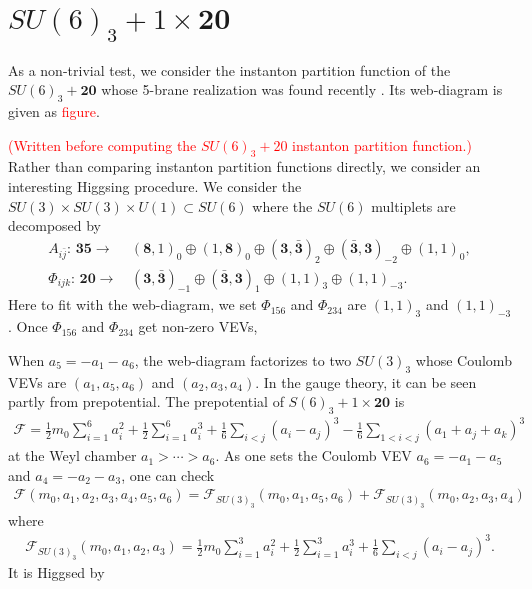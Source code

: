 \documentclass[12pt]{article}
\begin{document}
\section{$SU(6)_3+1\times\boldsymbol{20}$}

As a non-trivial test, we consider the instanton partition function of the $SU(6)_3+\boldsymbol{20}$ whose 5-brane realization was found recently \cite{Hayashi:2019yxj}. Its web-diagram is given as \textcolor{red}{figure}.

\textcolor{red}{(Written before computing the $SU(6)_3+20$ instanton partition function.)}\\
Rather than comparing instanton partition functions directly, we consider an interesting Higgsing procedure. We consider the $SU(3)\times SU(3)\times U(1)\subset SU(6)$ where the $SU(6)$ multiplets are decomposed by
\begin{align}
A_{i\bar{j}}:\,\boldsymbol{35}\longrightarrow&\,(\boldsymbol{8},1)_0\oplus (1,\boldsymbol{8})_0\oplus (\boldsymbol{3},\bar{\boldsymbol{3}})_2\oplus(\bar{\boldsymbol{3}},\boldsymbol{3})_{-2}\oplus(1,1)_0,\nonumber\\
\Phi_{ijk}:\,\boldsymbol{20}\longrightarrow&\,(\boldsymbol{3},\bar{\boldsymbol{3}})_{-1}\oplus(\bar{\boldsymbol{3}},\boldsymbol{3})_1\oplus(1,1)_3\oplus(1,1)_{-3}.
\end{align} 
Here to fit with the web-diagram, we set $\Phi_{156}$ and $\Phi_{234}$ are $(1,1)_3$ and $(1,1)_{-3}$. Once $\Phi_{156}$ and $\Phi_{234}$ get non-zero VEVs, 

 When $a_5=-a_1-a_6$, the web-diagram factorizes to two $SU(3)_3$ whose Coulomb VEVs are $(a_1, a_5, a_6)$ and $(a_2, a_3, a_4)$. In the gauge theory, it can be seen partly from prepotential. The prepotential of $S(6)_3+1\times\boldsymbol{20}$ is
\begin{align}
\mathcal{F}=\frac{1}{2}m_0\sum_{i=1}^{6}a_i^2+\frac{1}{2}\sum_{i=1}^{6}a_i^3+\frac{1}{6}\sum_{i<j}(a_i-a_j)^3-\frac{1}{6}\sum_{1<i<j}(a_1+a_j+a_k)^3
\end{align}
at the Weyl chamber $a_1>\cdots>a_6$. As one sets the Coulomb VEV $a_6=-a_1-a_5$ and $a_4=-a_2-a_3$, one can check
\begin{align}
\mathcal{F}(m_0,a_1,a_2,a_3,a_4,a_5,a_6)=\mathcal{F}_{SU(3)_3}(m_0,a_1,a_5,a_6)+\mathcal{F}_{SU(3)_3}(m_0,a_2,a_3,a_4)
\end{align}
where
\begin{align}
\mathcal{F}_{SU(3)_3}(m_0,a_1,a_2,a_3)=\frac{1}{2}m_0\sum_{i=1}^{3}a_i^2+\frac{1}{2}\sum_{i=1}^{3}a_i^3+\frac{1}{6}\sum_{i<j}(a_i-a_j)^3.
\end{align}
It is Higgsed by 
\end{document}
